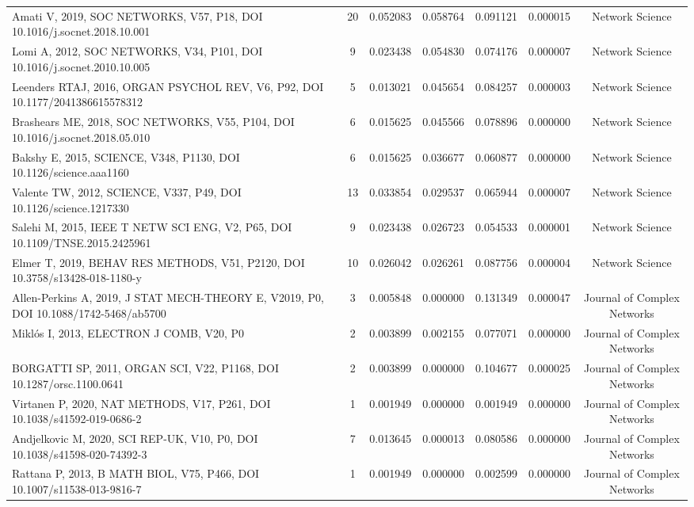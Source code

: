 \documentclass[twocolumn]{article}
\begin{document}
\begin{table}[htbp]
{\begin{tabular}{lcccccc}
					Amati V, 2019, SOC NETWORKS, V57, P18, DOI 10.1016/j.socnet.2018.10.001 & 20 & 0.052083 & 0.058764 & 0.091121 & 0.000015 & Network Science \\
					Lomi A, 2012, SOC NETWORKS, V34, P101, DOI 10.1016/j.socnet.2010.10.005 & 9 & 0.023438 & 0.054830 & 0.074176 & 0.000007 & Network Science \\
					Leenders RTAJ, 2016, ORGAN PSYCHOL REV, V6, P92, DOI 10.1177/2041386615578312 & 5 & 0.013021 & 0.045654 & 0.084257 & 0.000003 & Network Science \\
					Brashears ME, 2018, SOC NETWORKS, V55, P104, DOI 10.1016/j.socnet.2018.05.010 & 6 & 0.015625 & 0.045566 & 0.078896 & 0.000000 & Network Science \\
					Bakshy E, 2015, SCIENCE, V348, P1130, DOI 10.1126/science.aaa1160 & 6 & 0.015625 & 0.036677 & 0.060877 & 0.000000 & Network Science \\
					Valente TW, 2012, SCIENCE, V337, P49, DOI 10.1126/science.1217330 & 13 & 0.033854 & 0.029537 & 0.065944 & 0.000007 & Network Science \\
					Salehi M, 2015, IEEE T NETW SCI ENG, V2, P65, DOI 10.1109/TNSE.2015.2425961 & 9 & 0.023438 & 0.026723 & 0.054533 & 0.000001 & Network Science \\
					Elmer T, 2019, BEHAV RES METHODS, V51, P2120, DOI 10.3758/s13428-018-1180-y & 10 & 0.026042 & 0.026261 & 0.087756 & 0.000004 & Network Science \\
					Allen-Perkins A, 2019, J STAT MECH-THEORY E, V2019, P0, DOI 10.1088/1742-5468/ab5700 & 3 & 0.005848 & 0.000000 & 0.131349 & 0.000047 & Journal of Complex Networks \\
					Miklós I, 2013, ELECTRON J COMB, V20, P0 & 2 & 0.003899 & 0.002155 & 0.077071 & 0.000000 & Journal of Complex Networks \\
					BORGATTI SP, 2011, ORGAN SCI, V22, P1168, DOI 10.1287/orsc.1100.0641 & 2 & 0.003899 & 0.000000 & 0.104677 & 0.000025 & Journal of Complex Networks \\
					Virtanen P, 2020, NAT METHODS, V17, P261, DOI 10.1038/s41592-019-0686-2 & 1 & 0.001949 & 0.000000 & 0.001949 & 0.000000 & Journal of Complex Networks \\
					Andjelkovic M, 2020, SCI REP-UK, V10, P0, DOI 10.1038/s41598-020-74392-3 & 7 & 0.013645 & 0.000013 & 0.080586 & 0.000000 & Journal of Complex Networks \\
					Rattana P, 2013, B MATH BIOL, V75, P466, DOI 10.1007/s11538-013-9816-7 & 1 & 0.001949 & 0.000000 & 0.002599 & 0.000000 & Journal of Complex Networks \\

\end{tabular}}
\end{table}
\end{document}

